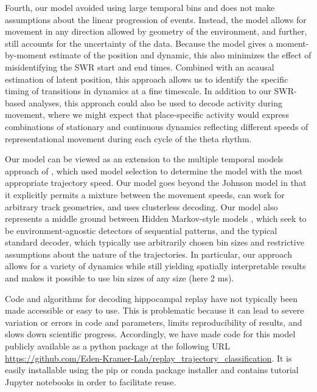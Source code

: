 \documentclass[9pt,lineno]{elife}
\begin{document}
Fourth, our model avoided using large temporal bins and does not make assumptions about the linear progression of events. Instead, the model allows for movement in any direction allowed by geometry of the environment, and further, still accounts for the uncertainty of the data. Because the model gives a moment-by-moment estimate of the position and dynamic, this also minimizes the effect of misidentifying the SWR start and end times. Combined with an acausal estimation of latent position, this approach allows us to identify the specific timing of transitions in dynamics at a fine timescale. In addition to our SWR-based analyses, this approach could also be used to decode activity during movement, where we might expect that place-specific activity would express combinations of stationary and continuous dynamics reflecting different speeds of representational movement during each cycle of the theta rhythm. 

Our model can be viewed as an extension to the multiple temporal models approach of \cite{JohnsonMeasuringdistributedproperties2008}, which used model selection to determine the model with the most appropriate trajectory speed. Our model goes beyond the Johnson model in that it explicitly permits a mixture between the movement speeds, can work for arbitrary track geometries, and uses clusterless decoding. Our model also represents a middle ground between Hidden Markov-style models \citep{MaboudiUncoveringtemporalstructure2018, ChenBayesiannonparametricmethods2016, LindermanBayesiannonparametricapproach2016, ChenUncoveringspatialtopology2012}, which seek to be environment-agnostic detectors of sequential patterns, and the typical standard decoder, which typically use arbitrarily chosen bin sizes and restrictive assumptions about the nature of the trajectories. In particular, our approach allows for a variety of dynamics while still yielding spatially interpretable results and makes it possible to use bin sizes of any size (here 2 ms).

Code and algorithms for decoding hippocampal replay have not typically been made accessible or easy to use. This is problematic because it can lead to severe variation or errors in code and parameters, limits reproducibility of results, and slows down scientific progress. Accordingly, we have made code for this model publicly available as a python package at the following URL \url{https://github.com/Eden-Kramer-Lab/replay_trajectory_classification}. It is easily installable using the pip or conda package installer and contains tutorial Jupyter notebooks in order to facilitate reuse.
\end{document}
